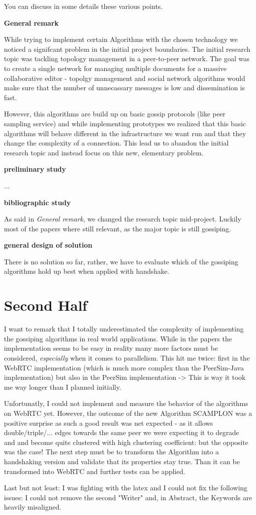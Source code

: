 \documentclass[11pt, english, screen]{report-rd-info}
\begin{document}
You can discuss in some details these various points.

\textbf{General remark}

While trying to implement certain Algorithms with the chosen technology we noticed a signifcant problem in the initial project boundaries.
The initial research topic was tackling topology management in a peer-to-peer network.
The goal was to create a single network for managing multiple documents for a massive collaborative editor - topolgy management and social network algorithms would make sure that the number of unnecassary messages is low and dissemination is fast.

However, this algorithms are build up on basic gossip protocols (like peer sampling service) and while implementing prototypes we realized that this basic algorithms will behave different in the infrastructure we want run and that they change the complexity of a connection.
This lead us to abandon the initial research topic and instead focus on this new, elementary problem.

\textbf{preliminary study}

...

\textbf{bibliographic study}

As said in \emph{General remark}, we changed the research topic mid-project. Luckily most of the papers where still relevant, as the major topic is still gossiping.

\textbf{general design of solution}

There is no solution so far, rather, we have to evaluate which of the gossiping algorithms hold up best when applied with handshake.

\section{Second Half}

I want to remark that I totally underestimated the complexity of implementing the gossiping algorithms in real world applications.
While in the papers the implementation seems to be easy in reality many more factors must be considered, \emph{especially} when it comes to parallelism.
This hit me twice: first in the WebRTC implementation (which is much more complex than the PeerSim-Java implementation) but also in the PeerSim implementation -> This is way it took me way longer than I planned initially.

Unfortunatly, I could not implement and measure the behavior of the algorithms on WebRTC yet.
However, the outcome of the new Algorithm SCAMPLON was a positive surprise as such a good result was net expected - as it allows double/triple/... edges towards the same peer we were expecting  it to degrade and and become quite clustered with high clustering coefficient: but the opposite was the case!
The next step must be to transform the Algorithm into a handshaking version and validate that its properties stay true.
Than it can be transformed into WebRTC and further tests can be applied.

Last but not least: I was fighting with the latex and I could not fix the following issues: I could not remove the second "Writer" and, in Abstract, the Keywords are heavily misaligned.
\end{document}
